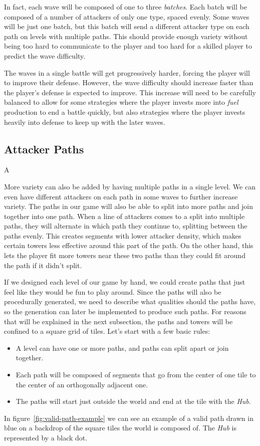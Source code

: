 In fact, each wave will be composed of one to three \emph{batches}.
Each batch will be composed of a number of attackers of only one type, spaced evenly.
Some waves will be just one batch, but this batch will send a different attacker type on each path on levels with multiple paths.
This should provide enough variety without being too hard to communicate to the player and too hard for a skilled player to predict the wave difficulty.

The waves in a single battle will get progressively harder, forcing the player will to improve their defense.
However, the wave difficulty should increase faster than the player's defense is expected to improve.
This increase will need to be carefully balanced to allow for some strategies where the player invests more into \emph{fuel} production to end a battle quickly, but also strategies where the player invests heavily into defense to keep up with the later waves.


\subsection{Attacker Paths}

A

More variety can also be added by having multiple paths in a single level.
We can even have different attackers on each path in some waves to further increase variety.
The paths in our game will also be able to split into more paths and join together into one path.
When a line of attackers comes to a split into multiple paths, they will alternate in which path they continue to, splitting between the paths evenly.
This creates segments with lower attacker density, which makes certain towers less effective around this part of the path.
On the other hand, this lets the player fit more towers near these two paths than they could fit around the path if it didn't split.

If we designed each level of our game by hand, we could create paths that just feel like they would be fun to play around.
Since the paths will also be procedurally generated, we need to describe what qualities should the paths have, so the generation can later be implemented to produce such paths.
For reasons that will be explained in the next subsection, the paths and towers will be confined to a square grid of tiles.
Let's start with a few basic rules:
\begin{itemize}
    \item A level can have one or more paths, and paths can split apart or join together.
    \item Each path will be composed of segments that go from the center of one tile to the center of an orthogonally adjacent one.
    \item The paths will start just outside the world and end at the tile with the \emph{Hub}.
\end{itemize}
In figure~\ref{fig:valid-path-example} we can see an example of a valid path drawn in blue on a backdrop of the square tiles the world is composed of.
The \emph{Hub} is represented by a black dot.

